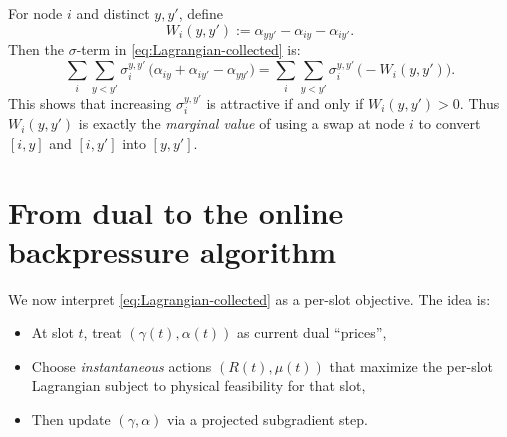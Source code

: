 \documentclass[11pt]{article}
\begin{document}
For node $i$ and distinct $y,y'$, define
\begin{equation}
W_i(y,y')
:= \alpha_{yy'}-\alpha_{iy}-\alpha_{iy'}.
\label{eq:Wi-def}
\end{equation}
Then the $\sigma$-term in \eqref{eq:Lagrangian-collected} is:
\[
\sum_i \sum_{y<y'}
\sigma_i^{y,y'}\,
\big(
\alpha_{iy}+\alpha_{iy'}-\alpha_{yy'}
\big)
= \sum_i \sum_{y<y'} \sigma_i^{y,y'}\,\big(-W_i(y,y')\big).
\]
This shows that increasing $\sigma_i^{y,y'}$ is attractive if and only if $W_i(y,y')>0$. Thus $W_i(y,y')$ is exactly the \emph{marginal value} of using a swap at node $i$ to convert $[i,y]$ and $[i,y']$ into $[y,y']$.

\section{From dual to the online backpressure algorithm}

We now interpret \eqref{eq:Lagrangian-collected} as a per-slot objective. The idea is:
\begin{itemize}[leftmargin=2em]
\item At slot $t$, treat $(\gamma(t),\alpha(t))$ as current dual ``prices'',
\item Choose \emph{instantaneous} actions $(R(t),\mu(t))$ that maximize the per-slot Lagrangian subject to physical feasibility for that slot,
\item Then update $(\gamma,\alpha)$ via a projected subgradient step.
\end{itemize}




\end{document}

